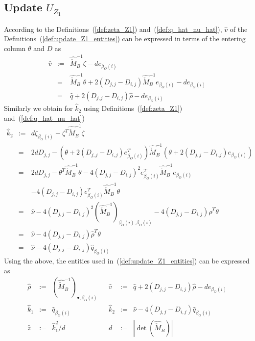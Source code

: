\documentclass[a4paper]{article}
\begin{document}
\subsection{Update $U_{Z_{1}}$}
According to the Definitions~(\ref{def:zeta_Z1})
and~(\ref{def:q_hat_nu_hat}), $\hat{v}$ of the 
Definitions~(\ref{def:update_Z1_entities}) can be expressed in terms
of the entering column $\theta$ and $D$ as
\begin{eqnarray*}
\hat{v}
&:=&
\hat{\check{M}}_{B}^{-1}\zeta - de_{\beta_{O}(i)} \\
&=&
\hat{\check{M}}_{B}^{-1}\theta
+2\left(D_{j,j}-D_{i,j}\right)\hat{\check{M}}_{B}^{-1}e_{\beta_{O}(i)}
-de_{\beta_{O}(i)} \\
&=&
\hat{q}+2\left(D_{j,j}-D_{i,j}\right)\hat{\rho}-de_{\beta_{O}(i)}
\end{eqnarray*}
Similarly we obtain for $\hat{k}_{2}$ using Definitions~(\ref{def:zeta_Z1})
and~(\ref{def:q_hat_nu_hat})
\begin{eqnarray*}
\hat{k}_{2}
&:=&
d\zeta_{\beta_{O}(i)}-\zeta^{T}\hat{\check{M}}_{B}^{-1}\zeta \\
&=&
2dD_{j,j}
-\left(\theta+2\left(D_{j,j}-D_{i,j}\right)e_{\beta_{O}(i)}^{T}\right)
\hat{\check{M}}_{B}^{-1}
\left(\theta+2\left(D_{j,j}-D_{i,j}\right)e_{\beta_{O}(i)}\right) \\
&=&
2dD_{j,j}-\theta^{T}\hat{\check{M}}_{B}^{-1}\theta
-4\left(D_{j,j}-D_{i,j}\right)^{2}
e_{\beta_{O}(i)}^{T}\hat{\check{M}}_{B}^{-1}e_{\beta_{O}(i)} \\
&&
-4\left(D_{j,j}-D_{i,j}\right)
e_{\beta_{O}(i)}^{T}\hat{\check{M}}_{B}^{-1}\theta \\
&=&
\hat{\nu}
-4\left(D_{j,j}-D_{i,j}\right)^{2}
\left(\hat{\check{M}}_{B}^{-1}\right)_{\beta_{O}(i), \beta_{O}(i)}
-4\left(D_{j,j}-D_{i,j}\right)\hat{\rho}^{T}\theta \\
&=&
\hat{\nu}
-4\left(D_{j,j}-D_{i,j}\right)\hat{\rho}^{T}\theta \\
&=&
\hat{\nu}
-4\left(D_{j,j}-D_{i,j}\right)\hat{q}_{\beta_{O}(i)}
\end{eqnarray*}
Using the above, the entities used
in~(\ref{def:update_Z1_entities}) can be expressed as
\begin{equation}
\label{def:update_Z1_entities_prep}
\begin{array}{rclcrcl}
\hat{\rho}
&:=&
\left(\hat{\check{M}}_{B}^{-1}\right)_{\bullet, \beta_{O}(i)}
&&
\hat{v}
&:=&
\hat{q}+2\left(D_{j,j}-D_{i,j}\right)\hat{\rho}-de_{\beta_{O}(i)}
\\
\hat{k}_{1}
&:=&
\hat{q}_{\beta_{O}(i)}
&&
\hat{k}_{2}
&:=&
\hat{\nu}
-4\left(D_{j,j}-D_{i,j}\right)\hat{q}_{\beta_{O}(i)}
\\
\hat{z}
&:=&
\hat{k}_{1}^{2}/d
&&
d
&:=&
\left|\det(\hat{\check{M}}_{B})\right|
\end{array}
\end{equation}
\end{document}
